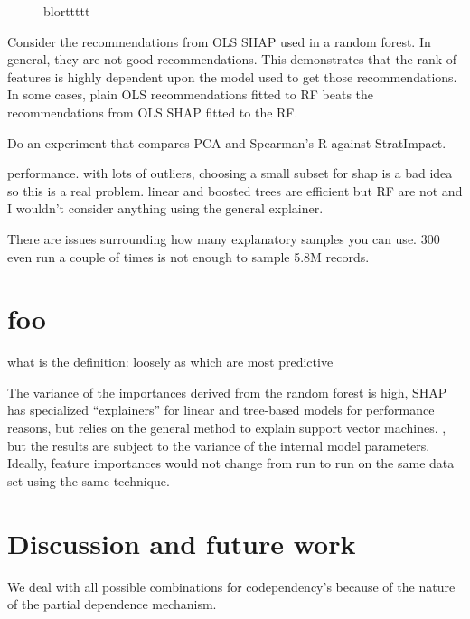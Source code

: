 \documentclass[twoside,11pt]{article}
\newcommand{\todo}[1]{{{\color{red}{[#1]}}}}
\begin{document}
\begin{figure}
\begin{subfigure}{1\textwidth}
\vspace{-2mm}\vspace{3mm}
\end{subfigure}
\caption[short]{blorttttt}
\label{fig:features}
\end{figure}

Consider the recommendations from OLS SHAP used in a random forest. In general, they are not good recommendations. This demonstrates that the rank of features is highly dependent upon the model used to get those recommendations. In some cases, plain OLS recommendations fitted to RF beats the recommendations from OLS SHAP fitted to the RF.

Do an experiment that compares PCA and Spearman's R against StratImpact.

performance. with lots of outliers, choosing a small subset for shap is a bad idea so this is a real problem. linear and boosted trees are efficient but RF are not and I wouldn't consider anything using the general explainer.

There are issues surrounding how many explanatory samples you can use. 300 even run a couple of times is not enough to sample 5.8M records.

\todo{We need min samples per x to avoid left edge issues as they skew entire pdp, which severely skews mass AUC.}

\todo{explain cat mechanism and how there is no left/right edge so no evidence used to weight AUC.}
 
\section{foo}

 what is the definition: loosely as which are most predictive

The variance of the importances derived from the random forest is high, SHAP has specialized ``explainers'' for linear and tree-based models for performance reasons, but relies on the general method to explain support vector machines. , but the results are subject to the variance of the internal model parameters.  Ideally, feature importances would not change from run to run on the same data set using the same technique.

\section{Discussion and future work}

We deal with all possible combinations for codependency's because of the nature of the partial dependence mechanism.
\end{document}

